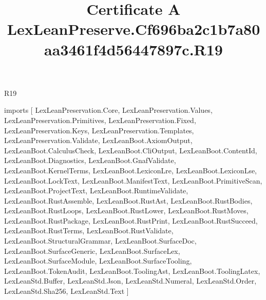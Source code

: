 \begin{lexlean}{R19}
\title{Certificate A LexLeanPreserve.Cf696ba2c1b7a80aa3461f4d56447897c.R19}
\begin{coremodule}
imports [
  LexLeanPreservation.Core,
  LexLeanPreservation.Values,
  LexLeanPreservation.Primitives,
  LexLeanPreservation.Fixed,
  LexLeanPreservation.Keys,
  LexLeanPreservation.Templates,
  LexLeanPreservation.Validate,
  LexLeanBoot.AxiomOutput,
  LexLeanBoot.CalculusCheck,
  LexLeanBoot.CliOutput,
  LexLeanBoot.ContentId,
  LexLeanBoot.Diagnostics,
  LexLeanBoot.GnafValidate,
  LexLeanBoot.KernelTerms,
  LexLeanBoot.LexiconLre,
  LexLeanBoot.LexiconLse,
  LexLeanBoot.LockText,
  LexLeanBoot.ManifestText,
  LexLeanBoot.PrimitiveScan,
  LexLeanBoot.ProjectText,
  LexLeanBoot.RuntimeValidate,
  LexLeanBoot.RustAssemble,
  LexLeanBoot.RustAst,
  LexLeanBoot.RustBodies,
  LexLeanBoot.RustLoops,
  LexLeanBoot.RustLower,
  LexLeanBoot.RustMoves,
  LexLeanBoot.RustPackage,
  LexLeanBoot.RustPrint,
  LexLeanBoot.RustSucceed,
  LexLeanBoot.RustTerms,
  LexLeanBoot.RustValidate,
  LexLeanBoot.StructuralGrammar,
  LexLeanBoot.SurfaceDoc,
  LexLeanBoot.SurfaceGeneric,
  LexLeanBoot.SurfaceLex,
  LexLeanBoot.SurfaceModule,
  LexLeanBoot.SurfaceTooling,
  LexLeanBoot.TokenAudit,
  LexLeanBoot.ToolingAst,
  LexLeanBoot.ToolingLatex,
  LexLeanStd.Buffer,
  LexLeanStd.Json,
  LexLeanStd.Numeral,
  LexLeanStd.Order,
  LexLeanStd.Sha256,
  LexLeanStd.Text
]


\end{coremodule}
\end{lexlean}
